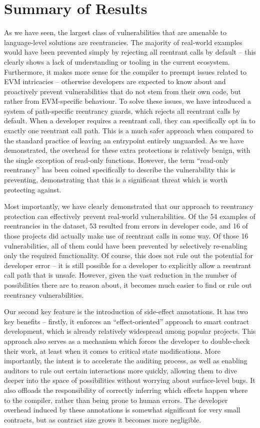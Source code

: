 \section{Summary of Results}
As we have seen, the largest class of vulnerabilities that are amenable to language-level solutions are reentrancies. The majority of real-world examples would have been prevented simply by rejecting all reentrant calls by default -- this clearly shows a lack of understanding or tooling in the current ecosystem. Furthermore, it makes more sense for the compiler to preempt issues related to EVM intricacies -- otherwise developers are expected to know about and proactively prevent vulnerabilities that do not stem from their own code, but rather from EVM-specific behaviour. To solve these issues, we have introduced a system of path-specific reentrancy guards, which rejects all reentrant calls by default. When a developer requires a reentrant call, they can specifically opt in to exactly one reentrant call path. This is a much safer approach when compared to the standard practice of leaving an entrypoint entirely unguarded. As we have demonstrated, the overhead for these extra protections is relatively benign, with the single exception of read-only functions. However, the term ``read-only reentrancy'' has been coined specifically to describe the vulnerability this is preventing, demonstrating that this is a significant threat which is worth protecting against.
\par
Most importantly, we have clearly demonstrated that our approach to reentrancy protection can effectively prevent real-world vulnerabilities. Of the 54 examples of reentrancies in the dataset, 53 resulted from errors in developer code, and 16 of those projects did actually make use of reentrant calls in some way. Of those 16 vulnerabilities, all of them could have been prevented by selectively re-enabling only the required functionality. Of course, this does not rule out the potential for developer error -- it is still possible for a developer to explicitly allow a reentrant call path that is unsafe. However, given the vast reduction in the number of possibilities there are to reason about, it becomes much easier to find or rule out reentrancy vulnerabilities.
\par
Our second key feature is the introduction of side-effect annotations. It has two key benefits -- firstly, it enforces an ``effect-oriented'' approach to smart contract development, which is already relatively widespread among popular projects. This approach also serves as a mechanism which forces the developer to double-check their work, at least when it comes to critical state modifications. More importantly, the intent is to accelerate the auditing process, as well as enabling auditors to rule out certain interactions more quickly, allowing them to dive deeper into the space of possibilities without worrying about surface-level bugs. It also offloads the responsibility of correctly inferring which effects happen where to the compiler, rather than being prone to human errors. The developer overhead induced by these annotations is somewhat significant for very small contracts, but as contract size grows it becomes more negligible.
